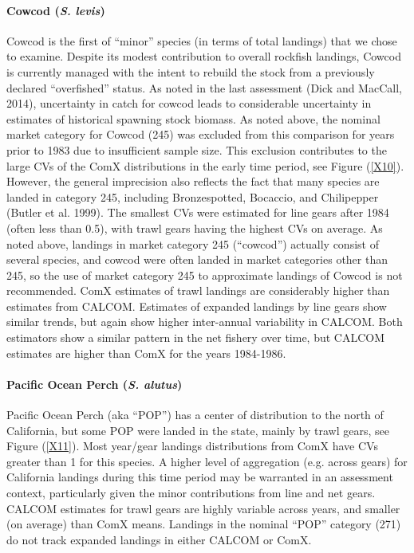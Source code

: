 \documentclass[12pt]{article}
\begin{document}
\paragraph{Cowcod (\textit{S. levis})}

Cowcod is the first of ``minor'' species (in terms of total landings) that we 
chose to examine. Despite its modest contribution to overall rockfish 
landings, Cowcod is currently managed with the intent to rebuild the stock 
from a previously declared “overfished” status. As noted in the last 
assessment (Dick and MacCall, 2014), uncertainty in catch for cowcod leads to 
considerable uncertainty in estimates of historical spawning stock biomass. As 
noted above, the nominal market category for Cowcod (245) was excluded from 
this comparison for years prior to 1983 due to insufficient sample size. This 
exclusion contributes to the large CVs of the ComX distributions in the early 
time period, see Figure (\ref{X10}). However, the general imprecision also 
reflects the fact that many species are landed in category 245, including 
Bronzespotted, Bocaccio, and Chilipepper (Butler et al. 1999). The smallest 
CVs were estimated for line gears after 1984 (often less than 0.5), with trawl 
gears having the highest CVs on average. As noted above, landings in market 
category 245 (``cowcod'') actually consist of several species, and cowcod were 
often landed in market categories other than 245, so the use of market 
category 245 to approximate landings of Cowcod is not recommended. ComX 
estimates of trawl landings are considerably higher than estimates from 
CALCOM. Estimates of expanded landings by line gears show similar trends, but 
again show higher inter-annual variability in CALCOM. Both estimators show a 
similar pattern in the net fishery over time, but CALCOM estimates are higher 
than ComX for the years 1984-1986.

\paragraph{Pacific Ocean Perch (\textit{S. alutus})}

Pacific Ocean Perch (aka ``POP'') has a center of distribution to the north of 
California, but some POP were landed in the state, mainly by trawl gears, see 
Figure (\ref{X11}). Most year/gear landings distributions from ComX have CVs 
greater than 1 for this species. A higher level of aggregation (e.g. across 
gears) for California landings during this time period may be warranted in an 
assessment context, particularly given the minor contributions from line and 
net gears. CALCOM estimates for trawl gears are highly variable across years, 
and smaller (on average) than ComX means. Landings in the nominal ``POP'' 
category (271) do not track expanded landings in either CALCOM or ComX.
\end{document}
